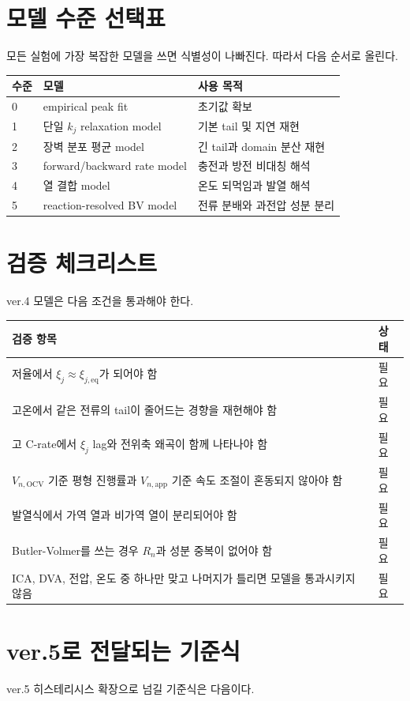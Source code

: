 \documentclass[11pt,a4paper]{article}
\newcommand{\OCV}{\mathrm{OCV}}
\newcommand{\app}{\mathrm{app}}
\newcommand{\eq}{\mathrm{eq}}
\begin{document}
\section{모델 수준 선택표}
모든 실험에 가장 복잡한 모델을 쓰면 식별성이 나빠진다. 따라서 다음 순서로 올린다.

\begin{longtable}{p{}p{}p{}}
\toprule
수준 & 모델 & 사용 목적 \\
\midrule
\endhead
0 & empirical peak fit & 초기값 확보 \\
1 & 단일 \(k_j\) relaxation model & 기본 tail 및 지연 재현 \\
2 & 장벽 분포 평균 model & 긴 tail과 domain 분산 재현 \\
3 & forward/backward rate model & 충전과 방전 비대칭 해석 \\
4 & 열 결합 model & 온도 되먹임과 발열 해석 \\
5 & reaction-resolved BV model & 전류 분배와 과전압 성분 분리 \\
\bottomrule
\end{longtable}

\section{검증 체크리스트}
ver.4 모델은 다음 조건을 통과해야 한다.

\begin{longtable}{p{}p{}}
\toprule
검증 항목 & 상태 \\
\midrule
\endhead
저율에서 \(\xi_j\approx\xi_{j,\eq}\)가 되어야 함 & 필요 \\
고온에서 같은 전류의 tail이 줄어드는 경향을 재현해야 함 & 필요 \\
고 C-rate에서 \(\xi_j\) lag와 전위축 왜곡이 함께 나타나야 함 & 필요 \\
\(V_{n,\OCV}\) 기준 평형 진행률과 \(V_{n,\app}\) 기준 속도 조절이 혼동되지 않아야 함 & 필요 \\
발열식에서 가역 열과 비가역 열이 분리되어야 함 & 필요 \\
Butler-Volmer를 쓰는 경우 \(R_n\)과 성분 중복이 없어야 함 & 필요 \\
ICA, DVA, 전압, 온도 중 하나만 맞고 나머지가 틀리면 모델을 통과시키지 않음 & 필요 \\
\bottomrule
\end{longtable}

\section{ver.5로 전달되는 기준식}
ver.5 히스테리시스 확장으로 넘길 기준식은 다음이다.
\end{document}

